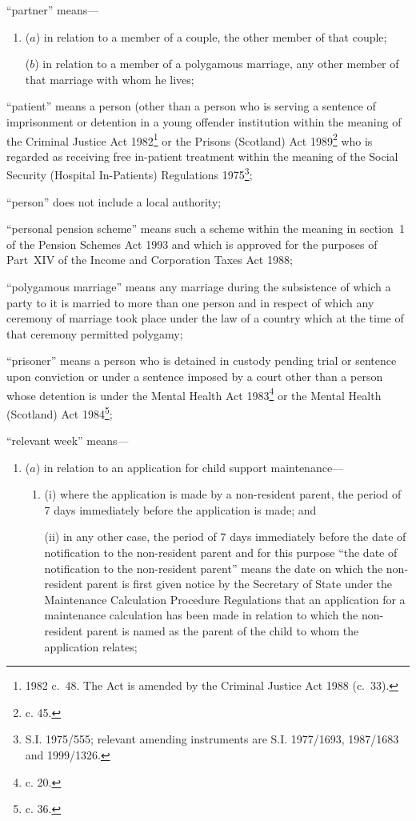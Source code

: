 \documentclass[12pt,a4paper]{article}
\begin{document}
\begin{enumerate}
“partner” means—
\begin{enumerate}\item[]
($a$) 
in relation to a member of a couple, the other member of that couple;

($b$) 
in relation to a member of a polygamous marriage, any other member of that marriage with whom he lives;
\end{enumerate}

“patient” means a person (other than a person who is serving a sentence of imprisonment or detention in a young offender institution within the meaning of the Criminal Justice Act 1982\footnote{1982 c.\ 48. The Act is amended by the Criminal Justice Act 1988 (c.~33).} or the Prisons (Scotland) Act 1989\footnote{ c. 45.} who is regarded as receiving free in-patient treatment within the meaning of the Social Security (Hospital In-Patients) Regulations 1975\footnote{\frenchspacing S.I. 1975/555; relevant amending instruments are S.I. 1977/1693, 1987/1683 and 1999/1326.};

“person” does not include a local authority;

“personal pension scheme” means such a scheme within the meaning in section~1 of the Pension Schemes Act 1993 and which is approved for the purposes of Part~XIV of the Income and Corporation Taxes Act 1988;

“polygamous marriage” means any marriage during the subsistence of which a party to it is married to more than one person and in respect of which any ceremony of marriage took place under the law of a country which at the time of that ceremony permitted polygamy;

“prisoner” means a person who is detained in custody pending trial or sentence upon conviction or under a sentence imposed by a court other than a person whose detention is under the Mental Health Act 1983\footnote{ c. 20.} or the Mental Health (Scotland) Act 1984\footnote{ c. 36.};

“relevant week” means—
\begin{enumerate}\item[]
($a$) 
in relation to an application for child support maintenance—
\begin{enumerate}\item[]
(i)
where the application is made by a non-resident parent, the period of 7 days immediately before the application is made; and

(ii)
in any other case, the period of 7 days immediately before the date of notification to the non-resident parent and for this purpose “the date of notification to the non-resident parent” means the date on which the non-resident parent is first given notice by the Secretary of State under the Maintenance Calculation Procedure Regulations that an application for a maintenance calculation has been made
in relation to which the non-resident parent is named as the parent of the child to whom the application relates;
\end{enumerate}


\end{enumerate}
\end{enumerate}
\end{document}
